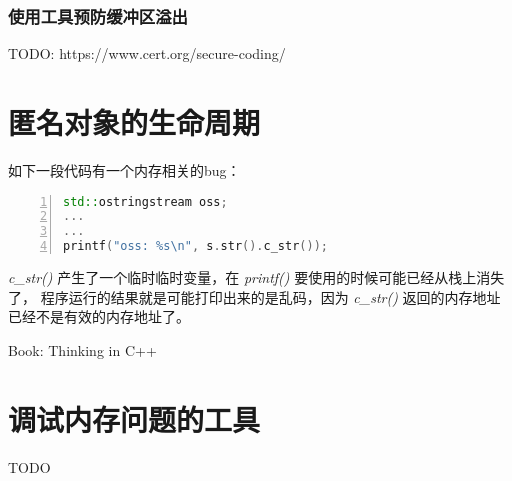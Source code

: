 \subsubsection{使用工具预防缓冲区溢出}

TODO: https://www.cert.org/secure-coding/


\section{匿名对象的生命周期}

如下一段代码有一个内存相关的bug：

\begin{lstlisting}[language={C++},numbers=left]
std::ostringstream oss;
...
...
printf("oss: %s\n", s.str().c_str());
\end{lstlisting}

\emph{c\_str()} 产生了一个临时临时变量，在 \emph{printf()} 要使用的时候可能已经从栈上消失了，
程序运行的结果就是可能打印出来的是乱码，因为 \emph{c\_str()} 返回的内存地址已经不是有效的内存地址了。

Book: Thinking in C++


\section{调试内存问题的工具}

TODO
